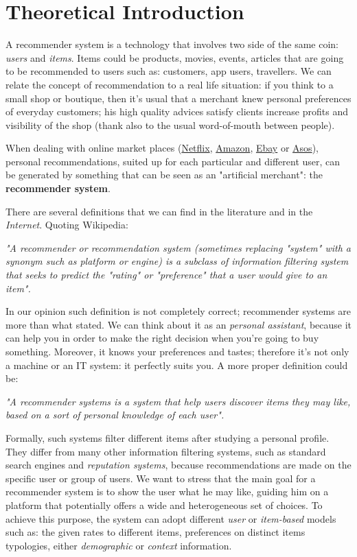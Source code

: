 \section{Theoretical Introduction}

A recommender system is a technology that involves two side of the same coin: \textit{users} and \textit{items}. Items could be products, movies, events, articles that are going to be recommended to users such as: customers, app users, travellers. We can relate the concept of recommendation to a real life situation: if you think to a small shop or boutique, then it's usual that a merchant knew personal preferences of everyday customers; his high quality advices satisfy clients increase profits and visibility of the shop (thank also to the usual word-of-mouth between people).

When dealing with online market places (\href{https://www.netflix.com/}{Netflix}, \href{https://www.amazon.com/}{Amazon}, \href{https://www.ebay.com/}{Ebay} or \href{http://www.asos.com/}{Asos}), personal recommendations, suited up for each particular and different user, can be generated by something that can be seen as an "artificial merchant": the \textbf{recommender system}.

There are several definitions that we can find in the literature and in the \textit{Internet}. Quoting Wikipedia: 

\textit{"A recommender or recommendation system (sometimes replacing "system" with a synonym such as platform or engine) is a subclass of information filtering system that seeks to predict the "rating" or "preference" that a user would give to an item".}

In our opinion such definition is not completely correct; recommender systems are more than what stated. We can think about it as an \textit{personal assistant}, because it can help you in order to make the right decision when you're going to buy something. Moreover, it knows your preferences and tastes; therefore it's not only a machine or an IT system: it perfectly suits you. A more proper definition could be: 

\textit{"A recommender systems is a system that help users discover items they may like, based on a sort of personal knowledge of each user".}

Formally, such systems filter different items after studying a personal profile. They differ from many other information filtering systems, such as standard search engines and \textit{reputation systems}, because recommendations are made on the specific user or group of users. 
We want to stress that the main goal for a recommender system is to show the user what he may like, guiding him on a platform that potentially offers a wide and heterogeneous set of choices. To achieve this purpose, the system can adopt different \textit{user} or \textit{item-based}  models such as: the given rates to different items, preferences on distinct items typologies, either \textit{demographic} or \textit{context} information. 

